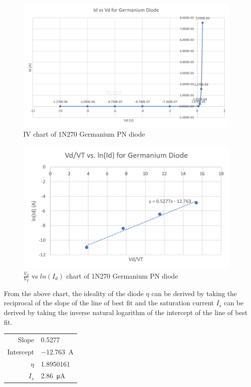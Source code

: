\documentclass{article}
\begin{document}
\begin{figure}[H]
  \centering
  \includegraphics[width=\textwidth]{ECE2200L_Lab2_Ge_IV.png}
  \caption{IV chart of 1N270 Germanium PN diode}
\end{figure}
\begin{figure}[H]
  \centering
  \includegraphics[width=\textwidth]{ECE2200L_Lab2_Ge_log.png}
  \caption{$\frac{V_d}{V_T}$ vs $ln(I_d)$ chart of 1N270 Germanium PN diode}
\end{figure}

From the above chart, the ideality of the diode $\eta$ can be derived by taking the reciprocal of the slope of the line of best fit and the saturation current $I_s$ can be derived by taking the inverse natural logarithm of the intercept of the line of best fit.

\begin{table}[H]
  \centering
    \begin{tabular}{rl}
    Slope & 0.5277 \\
    Intercept & \SI{-12.763}{\ampere} \\
    $\eta$     & 1.8950161 \\
    $I_s$    & \SI{2.86}{\micro\ampere} \\
    \end{tabular}
\end{table}
\end{document}
